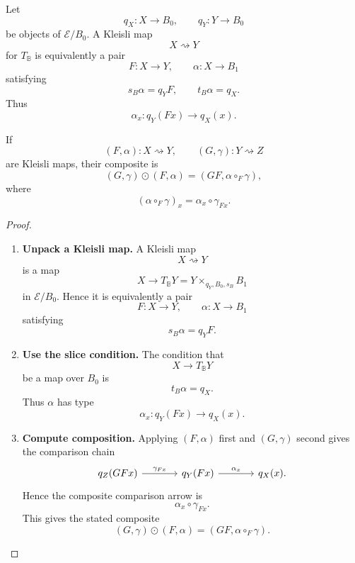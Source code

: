 \begin{proposition}
\label{prop:to-kleisli-normal-form}
    Let
    \[
        q_X:X\to B_0,
        \qquad
        q_Y:Y\to B_0
    \]
    be objects of \(\mathcal E/B_0\). A Kleisli map
    \[
        X\rightsquigarrow Y
    \]
    for \(T_{\mathbb B}\) is equivalently a pair
    \[
        F:X\to Y,
        \qquad
        \alpha:X\to B_1
    \]
    satisfying
    \[
        s_B\alpha=q_YF,
        \qquad
        t_B\alpha=q_X.
    \]
    Thus
    \[
        \alpha_x:q_Y(Fx)\to q_X(x).
    \]

    If
    \[
        (F,\alpha):X\rightsquigarrow Y,
        \qquad
        (G,\gamma):Y\rightsquigarrow Z
    \]
    are Kleisli maps, their composite is
    \[
        (G,\gamma)\odot(F,\alpha)
        =
        (GF,\alpha\circ_F\gamma),
    \]
    where
    \[
        (\alpha\circ_F\gamma)_x
        =
        \alpha_x\circ\gamma_{Fx}.
    \]
\end{proposition}

\begin{proof}
    \leavevmode
    \begin{enumerate}
        \item \textbf{Unpack a Kleisli map.}
        A Kleisli map
        \[
            X\rightsquigarrow Y
        \]
        is a map
        \[
            X\to T_{\mathbb B}Y
            =
            Y\times_{q_Y,B_0,s_B}B_1
        \]
        in \(\mathcal E/B_0\). Hence it is equivalently a pair
        \[
            F:X\to Y,
            \qquad
            \alpha:X\to B_1
        \]
        satisfying
        \[
            s_B\alpha=q_YF.
        \]

        \item \textbf{Use the slice condition.}
        The condition that
        \[
            X\to T_{\mathbb B}Y
        \]
        be a map over \(B_0\) is
        \[
            t_B\alpha=q_X.
        \]
        Thus \(\alpha\) has type
        \[
            \alpha_x:q_Y(Fx)\to q_X(x).
        \]

        \item \textbf{Compute composition.}
        Applying \((F,\alpha)\) first and \((G,\gamma)\) second gives the
        comparison chain
        \[
        \begin{tikzcd}[column sep=large, row sep=large]
            q_Z(GFx)
                \arrow[r, "\gamma_{Fx}"]
            &
            q_Y(Fx)
                \arrow[r, "\alpha_x"]
            &
            q_X(x).
        \end{tikzcd}
        \]
        Hence the composite comparison arrow is
        \[
            \alpha_x\circ\gamma_{Fx}.
        \]
        This gives the stated composite
        \[
            (G,\gamma)\odot(F,\alpha)
            =
            (GF,\alpha\circ_F\gamma).
        \]
    \end{enumerate}
\end{proof}

